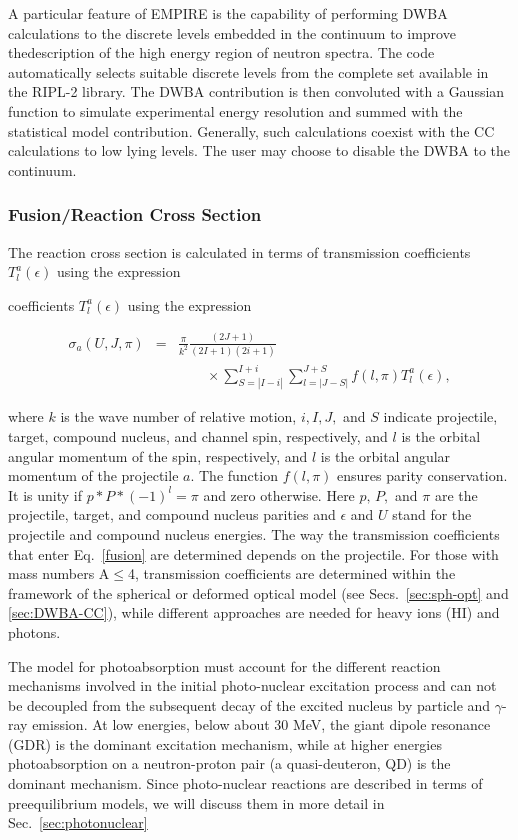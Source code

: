 \documentclass[twocolumn,amsmath,amssymb,10pt,groupedaddress,letter]{revtex4}
\begin{document}
A particular feature of EMPIRE is
the capability of performing DWBA calculations to the discrete levels
embedded in the continuum to improve thedescription of the high energy
region of neutron spectra. The code automatically selects suitable
discrete levels from the complete set available in the RIPL-2 library.
The DWBA contribution is then convoluted with a Gaussian function
to simulate experimental energy resolution and summed with the
statistical model contribution. Generally, such calculations coexist
with the CC calculations to low lying levels. The user may choose to disable
the DWBA to the continuum.


\subsubsection{Fusion/Reaction Cross Section\label{sec:fusion}}
The reaction cross section is calculated in terms of transmission
coefficients $T_{l}^{a}(\epsilon)$ using the expression

coefficients $T_{l}^{a}(\epsilon)$ using the expression

\begin{eqnarray}
\sigma_{a}(U,J,\pi) & = & \frac{\pi}{k^{2}}\frac{(2J+1)}{(2I+1)(2i+1)}\label{fusion}\\
 &  & \qquad\times
 \sum_{S=|I-i|}^{I+i}\sum_{l=|J-S|}^{J+S}f(l,\pi)T_{l}^{a}(\epsilon),\nonumber
 \end{eqnarray}


\noindent where $k$ is the wave number of relative motion, $i,I,J,$
and $S$ indicate projectile, target, compound nucleus, and channel
spin, respectively, and $l$ is the orbital angular momentum of the
spin, respectively, and $l$ is the orbital angular momentum of the
projectile $a$. The function $f(l,\pi)$ ensures parity conservation.
It is unity if $p*P*(-1)^{l}=\pi$ and zero otherwise. Here $p,\, P,$
and $\pi$ are the projectile, target, and compound nucleus parities and
$\epsilon$ and $U$ stand for the projectile and compound nucleus
energies. The way the transmission coefficients that enter Eq.~\ref{fusion}
are determined depends on the projectile. For those with mass numbers
A$\leq$4, transmission coefficients are determined within
the framework of the spherical or deformed optical model (see
Secs.~\ref{sec:sph-opt} and \ref{sec:DWBA-CC}),
while different approaches are needed for heavy ions (HI) and photons.

The model for photoabsorption must account for the different reaction
mechanisms involved in the initial photo-nuclear excitation process
and can not be decoupled from the subsequent decay of the excited
nucleus by particle and $\gamma$-ray emission. At low energies, below
about 30 MeV, the giant dipole resonance (GDR) is the dominant excitation
mechanism, while at higher energies photoabsorption on a neutron-proton
pair (a quasi-deuteron, QD) is the dominant mechanism. Since photo-nuclear
reactions are described in terms of preequilibrium models, we will discuss
them in more detail in Sec.~\ref{sec:photonuclear}
\end{document}
